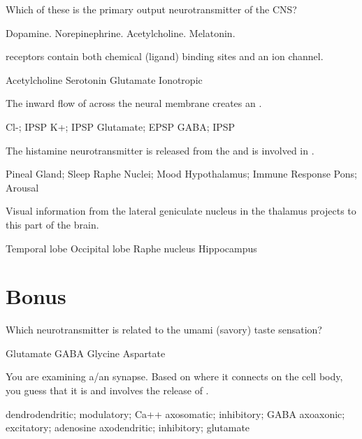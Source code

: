 \documentclass[answers]{exam}
\begin{document}
\begin{questions}
\question Which of these is the primary output neurotransmitter of the CNS?
\begin{choices}
\choice Dopamine.
\choice Norepinephrine.
\correctchoice Acetylcholine. 
\choice Melatonin.
\end{choices}

\question \fillin receptors contain both chemical (ligand) binding sites and an ion channel.
\begin{choices}
\choice Acetylcholine
\choice Serotonin
\choice Glutamate
\correctchoice Ionotropic
\end{choices}

\newpage

\question The inward flow of \fillin across the neural membrane creates an \fillin.
\begin{choices}
\correctchoice Cl-; IPSP
\choice K+; IPSP
\choice Glutamate; EPSP
\choice GABA; IPSP
\end{choices}

\question The histamine neurotransmitter is released from the \fillin and is involved in \fillin.
\begin{choices}
\choice Pineal Gland; Sleep
\choice Raphe Nuclei; Mood
\choice Hypothalamus; Immune Response
\choice Pons; Arousal
\end{choices}

\question Visual information from the lateral geniculate nucleus in the thalamus projects to this part of the brain.
\begin{choices}
\choice Temporal lobe
\correctchoice Occipital lobe
\choice Raphe nucleus
\choice Hippocampus
\end{choices}

\section{Bonus}

\question Which neurotransmitter is related to the umami (savory) taste sensation?
\begin{choices}
\correctchoice Glutamate
\choice GABA
\choice Glycine
\choice Aspartate
\end{choices}

\question You are examining a/an \fillin synapse. Based on where it connects on the cell body, you guess that it is \fillin and involves the release of \fillin.
\begin{choices}
\choice dendrodendritic; modulatory; Ca++
\correctchoice axosomatic; inhibitory; GABA
\choice axoaxonic; excitatory; adenosine
\choice axodendritic; inhibitory; glutamate
\end{choices}

\end{questions}
\end{document}
